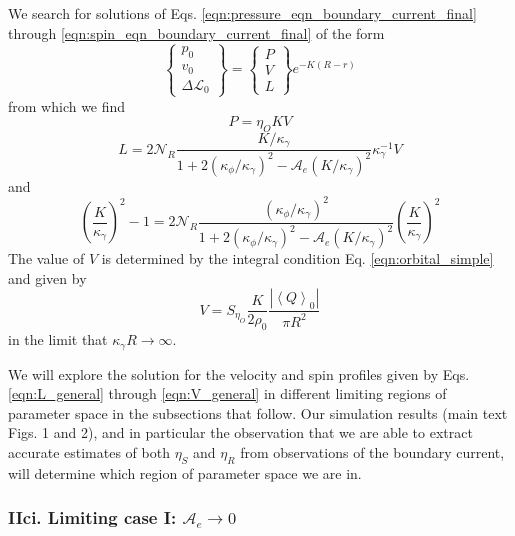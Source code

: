 \documentclass[%
 reprint,
superscriptaddress,
longbibliography,
 amsmath,amssymb,
 prl,
 citeautoscript,
]{revtex4-1}
\begin{document}
We search for solutions of Eqs. \ref{eqn:pressure_eqn_boundary_current_final} through \ref{eqn:spin_eqn_boundary_current_final} of the form
\begin{equation}
\begin{Bmatrix}
p_0 \\
v_0 \\
\Delta \mathcal{L}_0
\end{Bmatrix} =
\begin{Bmatrix}
P \\
V \\
L
\end{Bmatrix} e^{- K \left( R - r \right)}
\label{eqn:exponential_form_boundary_current}
\end{equation}
from which we find
\begin{equation}
P = \eta_O K V
\label{eqn:P_general}
\end{equation}
\begin{equation}
L = 2 \mathcal{N}_R \frac{K/\kappa_{\gamma}}{1 + 2 \left( \kappa_{\phi} / \kappa_{\gamma} \right)^2 - \mathcal{A}_e \left( K / \kappa_{\gamma} \right)^2} \kappa_{\gamma}^{-1} V
\label{eqn:L_general}
\end{equation}
and
\begin{equation}
\left( \frac{K}{\kappa_{\gamma}} \right)^2 - 1 = 2 \mathcal{N}_R \frac{\left( \kappa_{\phi} / \kappa_{\gamma} \right)^2}{1 + 2 \left( \kappa_{\phi} / \kappa_{\gamma} \right)^2 - \mathcal{A}_e \left( K / \kappa_{\gamma} \right)^2} \left( \frac{K}{\kappa_{\gamma}} \right)^2
\label{eqn:K_general}
\end{equation}
The value of $V$ is determined by the integral condition Eq. \ref{eqn:orbital_simple} and given by
\begin{equation}
V = S_{\eta_O} \frac{K}{2 \rho_0} \frac{\left| \left\langle Q \right\rangle_0 \right|}{\pi R^2}
\label{eqn:V_general}
\end{equation}
in the limit that $\kappa_{\gamma} R \rightarrow \infty$.

We will explore the solution for the velocity and spin profiles given by Eqs. \ref{eqn:L_general} through \ref{eqn:V_general} in different limiting regions of parameter space in the subsections that follow. Our simulation results (main text Figs. 1 and 2), and in particular the observation that we are able to extract accurate estimates of both $\eta_S$ and $\eta_R$ from observations of the boundary current, will determine which region of parameter space we are in.

\subsubsection{IIci. Limiting case I: $\mathcal{A}_e \rightarrow 0$}
\end{document}
